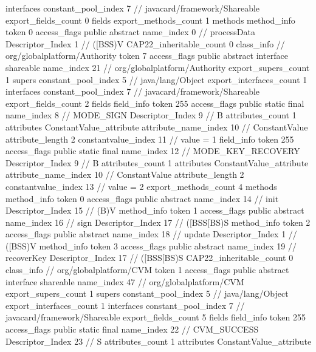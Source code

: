 {{{			interfaces {
				constant_pool_index	7		// javacard/framework/Shareable
			}
			export_fields_count	0
			fields {
			}
			export_methods_count	1
			methods {
				method_info {
					token	0
					access_flags	public abstract
					name_index	0		// processData
					Descriptor_Index	1		// ([BSS)V
				}
			}
			CAP22_inheritable_count	0
		}
		class_info {		// org/globalplatform/Authority
			token	7
			access_flags	public abstract interface shareable
			name_index	21		// org/globalplatform/Authority
			export_supers_count	1
			supers {
				constant_pool_index	5		// java/lang/Object
			}
			export_interfaces_count	1
			interfaces {
				constant_pool_index	7		// javacard/framework/Shareable
			}
			export_fields_count	2
			fields {
			field_info {
				token	255
				access_flags	public static final
				name_index	8		// MODE_SIGN
				Descriptor_Index	9		// B
				attributes_count	1
				attributes {
				ConstantValue_attribute {
					attribute_name_index	10		// ConstantValue
					attribute_length	2
					constantvalue_index	11		// value = 1
				}
				}
			}
			field_info {
				token	255
				access_flags	public static final
				name_index	12		// MODE_KEY_RECOVERY
				Descriptor_Index	9		// B
				attributes_count	1
				attributes {
				ConstantValue_attribute {
					attribute_name_index	10		// ConstantValue
					attribute_length	2
					constantvalue_index	13		// value = 2
				}
				}
			}
			}
			export_methods_count	4
			methods {
				method_info {
					token	0
					access_flags	public abstract
					name_index	14		// init
					Descriptor_Index	15		// (B)V
				}
				method_info {
					token	1
					access_flags	public abstract
					name_index	16		// sign
					Descriptor_Index	17		// ([BSS[BS)S
				}
				method_info {
					token	2
					access_flags	public abstract
					name_index	18		// update
					Descriptor_Index	1		// ([BSS)V
				}
				method_info {
					token	3
					access_flags	public abstract
					name_index	19		// recoverKey
					Descriptor_Index	17		// ([BSS[BS)S
				}
			}
			CAP22_inheritable_count	0
		}
		class_info {		// org/globalplatform/CVM
			token	1
			access_flags	public abstract interface shareable
			name_index	47		// org/globalplatform/CVM
			export_supers_count	1
			supers {
				constant_pool_index	5		// java/lang/Object
			}
			export_interfaces_count	1
			interfaces {
				constant_pool_index	7		// javacard/framework/Shareable
			}
			export_fields_count	5
			fields {
			field_info {
				token	255
				access_flags	public static final
				name_index	22		// CVM_SUCCESS
				Descriptor_Index	23		// S
				attributes_count	1
				attributes {
				ConstantValue_attribute {
}}}}}}}
